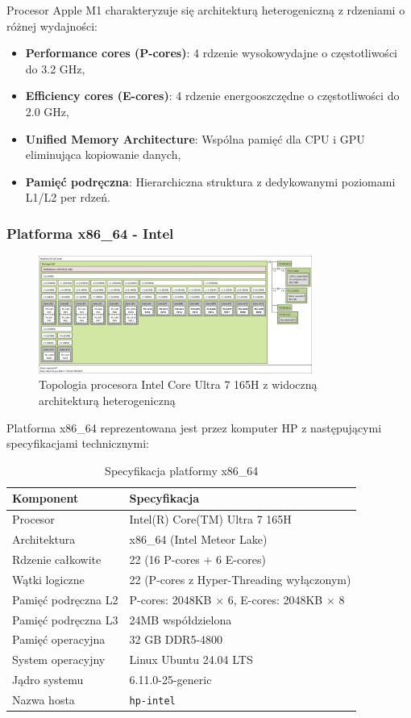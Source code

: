Procesor Apple M1 charakteryzuje się architekturą heterogeniczną  z rdzeniami o różnej wydajności:
\begin{itemize}
    \item \textbf{Performance cores (P-cores)}: 4 rdzenie wysokowydajne o częstotliwości do 3.2 GHz,
    \item \textbf{Efficiency cores (E-cores)}: 4 rdzenie energooszczędne o częstotliwości do 2.0 GHz,
    \item \textbf{Unified Memory Architecture}: Wspólna pamięć dla CPU i GPU eliminująca kopiowanie danych,
    \item \textbf{Pamięć podręczna}: Hierarchiczna struktura z dedykowanymi poziomami L1/L2 per rdzeń.
\end{itemize}

\subsubsection{Platforma x86\_64 - Intel}
\begin{figure}[H]
\centering
\includegraphics[width=0.8\textwidth]{images/x86.png}
\caption{Topologia procesora Intel Core Ultra 7 165H z widoczną architekturą heterogeniczną}
\label{fig:intel_topology}
\end{figure}
Platforma x86\_64 reprezentowana jest przez komputer HP z następującymi specyfikacjami technicznymi:

\begin{table}[h]
\centering
\caption{Specyfikacja platformy x86\_64}
\begin{tabular}{|l|l|}
\hline
\textbf{Komponent} & \textbf{Specyfikacja} \\
\hline
Procesor & Intel(R) Core(TM) Ultra 7 165H \\
Architektura & x86\_64 (Intel Meteor Lake) \\
Rdzenie całkowite & 22 (16 P-cores + 6 E-cores) \\
Wątki logiczne & 22 (P-cores z Hyper-Threading wyłączonym) \\
Pamięć podręczna L2 & P-cores: 2048KB $\times$ 6, E-cores: 2048KB $\times$ 8 \\
Pamięć podręczna L3 & 24MB współdzielona \\
Pamięć operacyjna & 32 GB DDR5-4800 \\
System operacyjny & Linux Ubuntu 24.04 LTS \\
Jądro systemu & 6.11.0-25-generic \\
Nazwa hosta & \texttt{hp-intel} \\
\hline
\end{tabular}

\label{tab:x86_specs}
\end{table}

